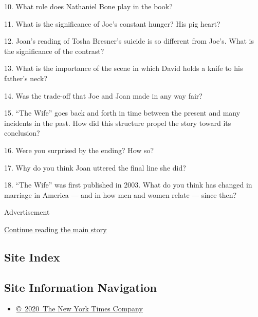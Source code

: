 10. What role does Nathaniel Bone play in the book?

11. What is the significance of Joe's constant hunger? His pig heart?

12. Joan's reading of Tosha Bresner's suicide is so different from
Joe's. What is the significance of the contrast?

13. What is the importance of the scene in which David holds a knife to
his father's neck?

14. Was the trade-off that Joe and Joan made in any way fair?

15. ``The Wife'' goes back and forth in time between the present and
many incidents in the past. How did this structure propel the story
toward its conclusion?

16. Were you surprised by the ending? How so?

17. Why do you think Joan uttered the final line she did?

18. ``The Wife'' was first published in 2003. What do you think has
changed in marriage in America --- and in how men and women relate ---
since then?

Advertisement

\protect\hyperlink{after-bottom}{Continue reading the main story}

\hypertarget{site-index}{%
\subsection{Site Index}\label{site-index}}

\hypertarget{site-information-navigation}{%
\subsection{Site Information
Navigation}\label{site-information-navigation}}

\begin{itemize}
\tightlist
\item
  \href{https://help.nytimes3xbfgragh.onion/hc/en-us/articles/115014792127-Copyright-notice}{©~2020~The
  New York Times Company}
\end{itemize}


